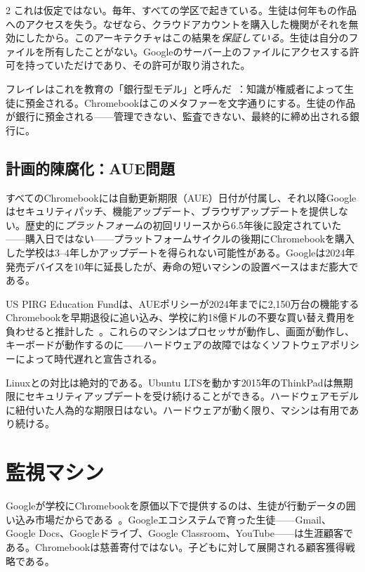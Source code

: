 \documentclass[11pt, a4paper]{article}
\begin{document}
\begin{multicols}{2}
これは仮定ではない。毎年、すべての学区で起きている。生徒は何年もの作品へのアクセスを失う。なぜなら、クラウドアカウントを購入した機関がそれを無効にしたから。このアーキテクチャはこの結果を\emph{保証している}。生徒は自分のファイルを所有したことがない。Googleのサーバー上のファイルにアクセスする許可を持っていただけであり、その許可が取り消された。

フレイレはこれを教育の「銀行型モデル」と呼んだ~\citep{freire1970pedagogy}：知識が権威者によって生徒に預金される。Chromebookはこのメタファーを文字通りにする。生徒の作品が銀行に預金される——管理できない、監査できない、最終的に締め出される銀行に。

\subsection{計画的陳腐化：AUE問題}

すべてのChromebookには自動更新期限（AUE）日付が付属し、それ以降Googleはセキュリティパッチ、機能アップデート、ブラウザアップデートを提供しない。歴史的に\emph{プラットフォーム}の初回リリースから6.5年後に設定されていた——購入日ではない——プラットフォームサイクルの後期にChromebookを購入した学校は3--4年しかアップデートを得られない可能性がある。Googleは2024年発売デバイスを10年に延長したが、寿命の短いマシンの設置ベースはまだ膨大である。

US PIRG Education Fundは、AUEポリシーが2024年までに2,150万台の機能するChromebookを早期退役に追い込み、学校に約18億ドルの不要な買い替え費用を負わせると推計した~\citep{pirg2023chromebook}。これらのマシンはプロセッサが動作し、画面が動作し、キーボードが動作するのに——ハードウェアの故障ではなくソフトウェアポリシーによって時代遅れと宣告される。

Linuxとの対比は絶対的である。Ubuntu LTSを動かす2015年のThinkPadは無期限にセキュリティアップデートを受け続けることができる。ハードウェアモデルに紐付いた人為的な期限日はない。ハードウェアが動く限り、マシンは有用であり続ける。


\section{監視マシン}
\label{sec:surveillance}

Googleが学校にChromebookを原価以下で提供するのは、生徒が行動データの囲い込み市場だからである~\citep{zuboff2019surveillance, doctorow2020attack}。Googleエコシステムで育った生徒——Gmail、Google Docs、Googleドライブ、Google Classroom、YouTube——は生涯顧客である。Chromebookは慈善寄付ではない。子どもに対して展開される顧客獲得戦略である。


\end{multicols}
\end{document}
